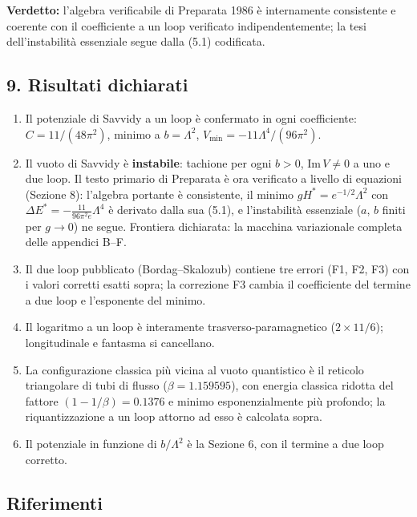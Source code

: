\documentclass[
]{article}
\providecommand{\tightlist}{%
  \setlength{\itemsep}{0pt}\setlength{\parskip}{0pt}}
\begin{document}
\textbf{Verdetto:} l'algebra verificabile di Preparata 1986 è
internamente consistente e coerente con il coefficiente a un loop
verificato indipendentemente; la tesi dell'instabilità essenziale segue
dalla (5.1) codificata.

\hypertarget{risultati-dichiarati}{%
\subsection{9. Risultati dichiarati}\label{risultati-dichiarati}}

\begin{enumerate}
\def\labelenumi{\arabic{enumi}.}
\tightlist
\item
  Il potenziale di Savvidy a un loop è confermato in ogni coefficiente:
  \(C = 11/(48\pi^2)\), minimo a \(b = \Lambda^2\),
  \(V_{\min} = -11\Lambda^4/(96\pi^2)\).
\item
  Il vuoto di Savvidy è \textbf{instabile}: tachione per ogni \(b>0\),
  \(\mathrm{Im}\,V \neq 0\) a uno e due loop. Il testo primario di
  Preparata è ora verificato a livello di equazioni (Sezione 8):
  l'algebra portante è consistente, il minimo
  \(gH^* = e^{-1/2}\Lambda^2\) con
  \(\Delta E^* = -\frac{11}{96\pi^2 e}\Lambda^4\) è derivato dalla sua
  (5.1), e l'instabilità essenziale (\(a\), \(b\) finiti per
  \(g \to 0\)) ne segue. Frontiera dichiarata: la macchina variazionale
  completa delle appendici B--F.
\item
  Il due loop pubblicato (Bordag--Skalozub) contiene tre errori (F1, F2,
  F3) con i valori corretti esatti sopra; la correzione F3 cambia il
  coefficiente del termine a due loop e l'esponente del minimo.
\item
  Il logaritmo a un loop è interamente trasverso-paramagnetico
  (\(2 \times 11/6\)); longitudinale e fantasma si cancellano.
\item
  La configurazione classica più vicina al vuoto quantistico è il
  reticolo triangolare di tubi di flusso (\(\beta = 1.159595\)), con
  energia classica ridotta del fattore \((1 - 1/\beta) = 0.1376\) e
  minimo esponenzialmente più profondo; la riquantizzazione a un loop
  attorno ad esso è calcolata sopra.
\item
  Il potenziale in funzione di \(b/\Lambda^2\) è la Sezione 6, con il
  termine a due loop corretto.
\end{enumerate}

\hypertarget{riferimenti}{%
\subsection{Riferimenti}\label{riferimenti}}
\end{document}
